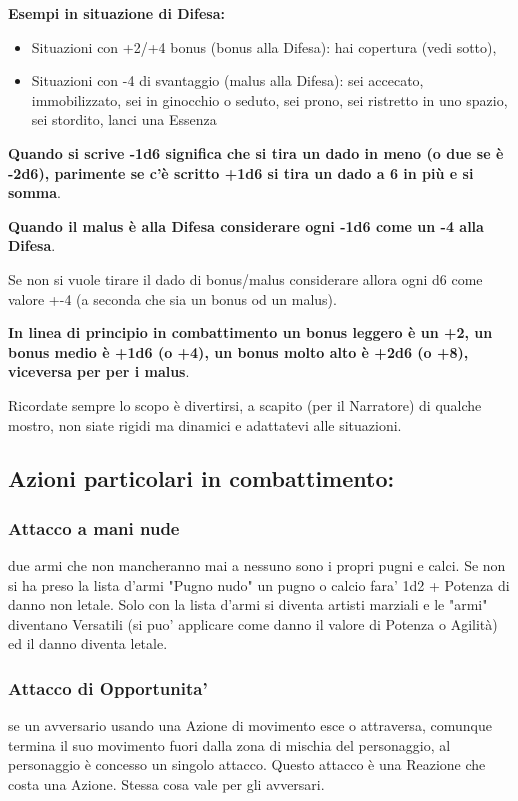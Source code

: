 \documentclass[a4paper,11pt,twoside,openany]{book}
\begin{document}
\textbf{Esempi in situazione di Difesa:}

\begin{itemize}
	\item Situazioni con +2/+4 bonus (bonus alla Difesa): hai copertura (vedi sotto),

	\item Situazioni con -4 di svantaggio (malus alla Difesa): sei accecato, immobilizzato, sei in ginocchio o seduto, sei prono, sei ristretto in uno spazio, sei stordito, lanci una Essenza
\end{itemize}

\textbf{Quando si scrive -1d6 significa che si tira un dado in meno (o due se è -2d6), parimente se c'è scritto +1d6 si tira un dado a 6 in più e si somma}.

\textbf{Quando il malus è alla Difesa considerare ogni -1d6 come un -4 alla Difesa}.

Se non si vuole tirare il dado di bonus/malus considerare allora ogni d6 come valore +-4 (a seconda che sia un bonus od un malus).

\textbf{In linea di principio in combattimento un bonus leggero è un +2, un bonus medio è +1d6 (o +4), un bonus molto alto è +2d6 (o +8), viceversa per per i malus}.

\bigskip
Ricordate sempre lo scopo è divertirsi, a scapito (per il Narratore) di qualche mostro, non siate rigidi ma dinamici e adattatevi alle situazioni.

\subsection{Azioni particolari in combattimento:}

\subsubsection{Attacco a mani nude}   due armi che non mancheranno mai a nessuno sono i propri pugni e calci.
Se non si ha preso la lista d'armi "Pugno nudo" un pugno o calcio fara' 1d2 + Potenza di danno non letale.
Solo con la lista d'armi si diventa artisti marziali e le "armi" diventano Versatili (si puo' applicare come danno il valore di Potenza o Agilità) ed il danno diventa letale.

\subsubsection{Attacco di Opportunita'} se un avversario usando una Azione di movimento esce o attraversa, comunque termina il suo movimento fuori dalla zona di mischia del personaggio, al personaggio è concesso un singolo attacco. Questo attacco è una Reazione che costa una Azione. Stessa cosa vale per gli avversari.
\end{document}
